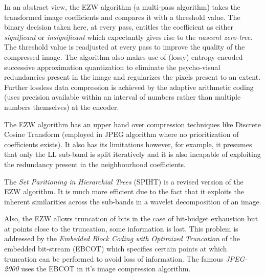 \documentclass[./A14_Report.tex]{subfiles}
\begin{document}
\par

In an abstract view, the EZW algorithm (a multi-pass algorithm) takes the
transformed image coefficients and compares it with a threshold value. The
binary decision taken here, at every pass, entitles the coefficient as either
\textit{significant} or \textit{insignificant} which expectantly gives rise to
the \textit{nascent zero-tree}. The threshold value is readjusted at every pass
to improve the quality of the compressed image. The algorithm also makes use of
(lossy) entropy-encoded successive approximation quantization to eliminate the
psycho-visual redundancies present in the image and regularizes the pixels
present to an extent. Further lossless data compression is achieved by the
adaptive arithmetic coding (uses precision available within an interval of
numbers rather than multiple numbers themselves) at the encoder.

\par

The EZW algorithm has an upper hand over compression techniques like Discrete
Cosine Transform (employed in JPEG algorithm where no prioritization of
coefficients exists). It also has its limitations however, for example, it
presumes that only the LL sub-band is split iteratively and it is also
incapable of exploiting the redundancy present in the neighbourhood
coefficients.

The \textit{Set Paritioning in Hierarchial Trees} (SPIHT) is a revised version
of the EZW algorithm. It is much more efficient due to the fact that it
exploits the inherent similarities across the sub-bands in a wavelet
decomposition of an image. \cite{sayood_datac}

\par

Also, the EZW allows truncation of bits in the case of bit-budget exhaustion
but at points close to the truncation, some information is lost. This problem
is addressed by the \textit{Embedded Block Coding with Optimized Truncation} of
the embedded bit-stream (EBCOT) which specifies certain points at which
truncation can be performed to avoid loss of information. The famous
\textit{JPEG-2000} uses the EBCOT in it's image compression algorithm. \cite{sayood_datac}
\end{document}
